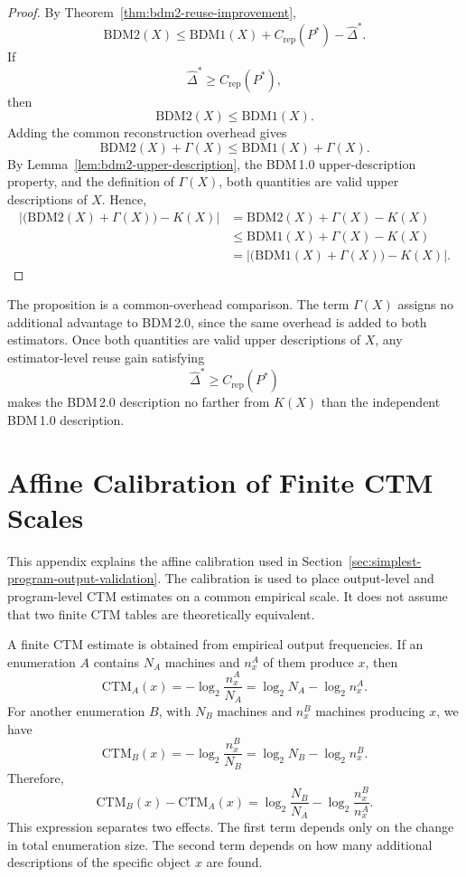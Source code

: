 \documentclass{article}
\begin{document}
\begin{proof}
By Theorem~\ref{thm:bdm2-reuse-improvement},
\[
\mathrm{BDM2}(X)
\leq
\mathrm{BDM1}(X)
+
C_{\mathrm{rep}}(P^*)
-
\hat{\Delta}^{*}.
\]
If
\[
\hat{\Delta}^{*}
\geq
C_{\mathrm{rep}}(P^*),
\]
then
\[
\mathrm{BDM2}(X)
\leq
\mathrm{BDM1}(X).
\]
Adding the common reconstruction overhead gives
\[
\mathrm{BDM2}(X)+\Gamma(X)
\leq
\mathrm{BDM1}(X)+\Gamma(X).
\]
By Lemma~\ref{lem:bdm2-upper-description}, the BDM\,1.0 upper-description property, and the definition of \(\Gamma(X)\), both quantities are valid upper descriptions of \(X\). Hence,
\[
\begin{aligned}
\left|
\bigl(\mathrm{BDM2}(X)+\Gamma(X)\bigr)-K(X)
\right|
&=
\mathrm{BDM2}(X)+\Gamma(X)-K(X)
\\
&\leq
\mathrm{BDM1}(X)+\Gamma(X)-K(X)
\\
&=
\left|
\bigl(\mathrm{BDM1}(X)+\Gamma(X)\bigr)-K(X)
\right|.
\end{aligned}
\]
\end{proof}

The proposition is a common-overhead comparison. The term \(\Gamma(X)\) assigns no additional advantage to BDM\,2.0, since the same overhead is added to both estimators. Once both quantities are valid upper descriptions of \(X\), any estimator-level reuse gain satisfying
\[
\hat{\Delta}^{*}
\geq
C_{\mathrm{rep}}(P^*)
\]
makes the BDM\,2.0 description no farther from \(K(X)\) than the independent BDM\,1.0 description.

\section{Affine Calibration of Finite CTM Scales}
\label{app:ctm-affine-calibration}

This appendix explains the affine calibration used in Section~\ref{sec:simplest-program-output-validation}. The calibration is used to place output-level and program-level CTM estimates on a common empirical scale. It does not assume that two finite CTM tables are theoretically equivalent.

A finite CTM estimate is obtained from empirical output frequencies. If an enumeration \(A\) contains \(N_A\) machines and \(n_x^A\) of them produce \(x\), then
\[
\mathrm{CTM}_A(x)
=
-\log_2\frac{n_x^A}{N_A}
=
\log_2N_A-\log_2n_x^A.
\]
For another enumeration \(B\), with \(N_B\) machines and \(n_x^B\) machines producing \(x\), we have
\[
\mathrm{CTM}_B(x)
=
-\log_2\frac{n_x^B}{N_B}
=
\log_2N_B-\log_2n_x^B.
\]
Therefore,
\[
\mathrm{CTM}_B(x)-\mathrm{CTM}_A(x)
=
\log_2\frac{N_B}{N_A}
-
\log_2\frac{n_x^B}{n_x^A}.
\]
This expression separates two effects. The first term depends only on the change in total enumeration size. The second term depends on how many additional descriptions of the specific object \(x\) are found.
\end{document}
